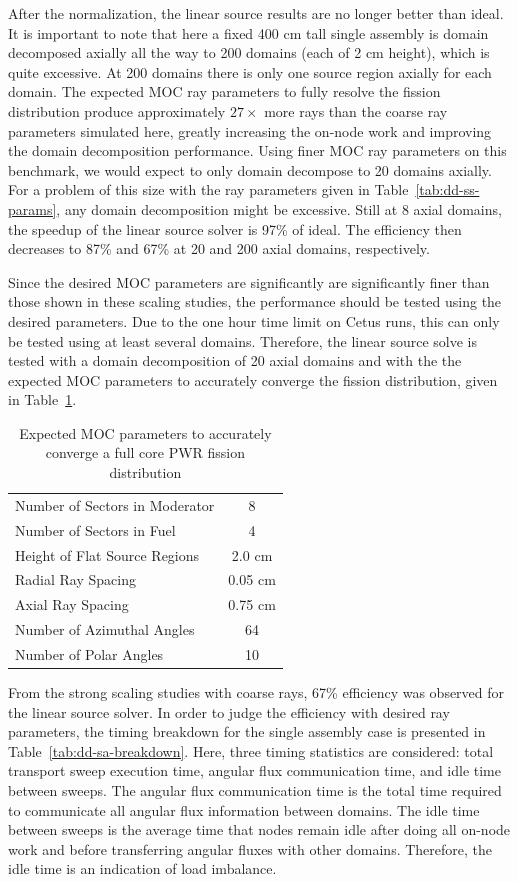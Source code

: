 After the normalization, the linear source results are no longer better than ideal. It is important to note that here a fixed 400 cm tall single assembly is domain decomposed axially all the way to 200 domains (each of 2 cm height), which is quite excessive. At 200 domains there is only one source region axially for each domain. The expected \ac{MOC} ray parameters to fully resolve the fission distribution produce approximately $27\times$ more rays than the coarse ray parameters simulated here, greatly increasing the on-node work and improving the domain decomposition performance. Using finer \ac{MOC} ray parameters on this benchmark, we would expect to only domain decompose to 20 domains axially. For a problem of this size with the ray parameters given in Table~\ref{tab:dd-ss-params}, any domain decomposition might be excessive. Still at 8 axial domains, the speedup of the linear source solver is 97\% of ideal. The efficiency then decreases to 87\% and 67\% at 20 and 200 axial domains, respectively.

Since the desired \ac{MOC} parameters are significantly are significantly finer than those shown in these scaling studies, the performance should be tested using the desired parameters. Due to the one hour time limit on Cetus runs, this can only be tested using at least several domains. Therefore, the linear source solve is tested with a domain decomposition of 20 axial domains and with the the expected \ac{MOC} parameters to accurately converge the fission distribution, given in Table~\ref{tab:expected-moc-params}.

\begin{table}[ht]
	\centering
	\caption{Expected MOC parameters to accurately converge a full core PWR fission distribution}
	\medskip
	\begin{tabular}{lc}
		\hline
		Number of Sectors in Moderator & 8 \\
		Number of Sectors in Fuel & 4 \\
		Height of Flat Source Regions & 2.0 cm \\
		Radial Ray Spacing & 0.05 cm \\
		Axial Ray Spacing & 0.75 cm \\
		Number of Azimuthal Angles & 64 \\
		Number of Polar Angles & 10 \\
		\hline
	\end{tabular}
	\label{tab:expected-moc-params}
\end{table}

From the strong scaling studies with coarse rays, 67\% efficiency was observed for the linear source solver. In order to judge the efficiency with desired ray parameters, the timing breakdown for the single assembly case is presented in Table~\ref{tab:dd-sa-breakdown}. Here, three timing statistics are considered: total transport sweep execution time, angular flux communication time, and idle time between sweeps. The angular flux communication time is the total time required to communicate all angular flux information between domains. The idle time between sweeps is the average time that nodes remain idle after doing all on-node work and before transferring angular fluxes with other domains. Therefore, the idle time is an indication of load imbalance.

